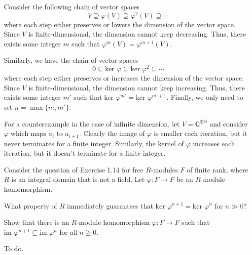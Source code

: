 \documentclass[../../master.tex]{subfiles}
\begin{document}
\begin{solution}
    Consider the following chain of vector spaces
    \[
        V \supseteq \varphi(V) \supseteq \varphi^2 (V) \supseteq \cdots
    \]
    where each step either preserves or lowers the dimension of the vector space.
    Since $V$ is finite-dimensional, the dimension cannot keep decreasing.
    Thus, there exists some integer $m$ such that $\varphi^{m}(V) = \varphi^{m+1}(V)$.

    Similarly, we have the chain of vector spaces
    \[
        0 \subseteq \text{ker } \varphi \subseteq \text{ker } \varphi^2 \subseteq \cdots
    \]
    where each step either preserves or increases the dimension of the vector space.
    Since $V$ is finite-dimensional, the dimension cannot keep increasing.
    Thus, there exists some integer $m'$ such that $\text{ker } \varphi^{m'} = \text{ker } \varphi^{m' + 1}$.
    Finally, we only need to set $n = \max\{m, m'\}$.

    For a counterexample in the case of infinite dimension, let $V = \mathbb{Q}^{\oplus \mathbb{N}}$ and consider $\varphi$ which maps $a_i$ to $a_{i + 1}$.
    Clearly the image of $\varphi$ is smaller each iteration, but it never terminates for a finite integer.
    Similarly, the kernel of $\varphi$ increases each iteration, but it doesn't terminate for a finite integer.
\end{solution}

\begin{problem}
    Consider the question of Exercise 1.14 for free $R$-modules $F$ of finite rank, where $R$ is an integral domain that is not a field.
    Let $\varphi : F \to F$ be an $R$-module homomorphism.

    What property of $R$ immediately guarantees that $\text{ker } \varphi^{n+1} = \text{ker } \varphi^{n}$ for $n \gg 0$?

    Show that there is an $R$-module homomorphism $\varphi: F \to F$ such that $\text{im } \varphi^{n+1} \subsetneq \text{im } \varphi^{n}$ for all $n \geq 0$.
\end{problem}

\begin{solution}
    To do.
\end{solution}
\end{document}
